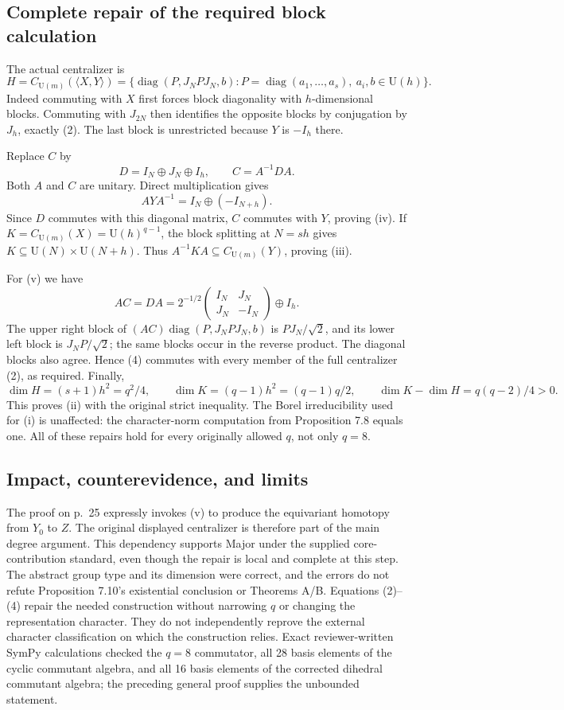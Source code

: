 \documentclass[10pt]{article}
\begin{document}
\subsection*{Complete repair of the required block calculation}
The actual centralizer is \[H=C_{\mathrm U(m)}(\langle X,Y\rangle)
 =\{\operatorname{diag}(P,J_NPJ_N,b):
       P=\operatorname{diag}(a_1,\ldots,a_s),\ a_i,b\in\mathrm U(h)\}.
 \tag{2}\] Indeed commuting with \(X\) first forces block diagonality with \(h\)-dimensional blocks. Commuting with \(J_{2N}\) then identifies the opposite blocks by conjugation by \(J_h\), exactly (2). The last block is unrestricted because \(Y\) is \(-I_h\) there.\par
Replace \(C\) by \[D=I_N\oplus J_N\oplus I_h,\qquad C=A^{-1}DA.
 \tag{3}\] Both \(A\) and \(C\) are unitary. Direct multiplication gives \[AYA^{-1}=I_N\oplus(-I_{N+h}).\] Since \(D\) commutes with this diagonal matrix, \(C\) commutes with \(Y\), proving (iv). If \(K=C_{\mathrm U(m)}(X)=\mathrm U(h)^{q-1}\), the block splitting at \(N=sh\) gives \(K\subseteq\mathrm U(N)\times\mathrm U(N+h)\). Thus \(A^{-1}KA\subseteq C_{\mathrm U(m)}(Y)\), proving (iii).\par
For (v) we have \[AC=DA=2^{-1/2}
 \begin{pmatrix}I_N&J_N\\ J_N&-I_N\end{pmatrix}\oplus I_h .
 \tag{4}\] The upper right block of \((AC)\operatorname{diag}(P,J_NPJ_N,b)\) is \(PJ_N/\sqrt2\), and its lower left block is \(J_NP/\sqrt2\); the same blocks occur in the reverse product. The diagonal blocks also agree. Hence (4) commutes with every member of the full centralizer (2), as required. Finally, \[\dim H=(s+1)h^2=q^2/4,\qquad
 \dim K=(q-1)h^2=(q-1)q/2,\qquad
 \dim K-\dim H=q(q-2)/4>0.\] This proves (ii) with the original strict inequality. The Borel irreducibility used for (i) is unaffected: the character-norm computation from Proposition 7.8 equals one. All of these repairs hold for every originally allowed \(q\), not only \(q=8\).\par
\subsection*{Impact, counterevidence, and limits}
The proof on p. 25 expressly invokes (v) to produce the equivariant homotopy from \(Y_0\) to \(Z\). The original displayed centralizer is therefore part of the main degree argument. This dependency supports Major under the supplied core-contribution standard, even though the repair is local and complete at this step. The abstract group type and its dimension were correct, and the errors do not refute Proposition 7.10’s existential conclusion or Theorems A/B. Equations (2)–(4) repair the needed construction without narrowing \(q\) or changing the representation character. They do not independently reprove the external character classification on which the construction relies. Exact reviewer-written SymPy calculations checked the \(q=8\) commutator, all 28 basis elements of the cyclic commutant algebra, and all 16 basis elements of the corrected dihedral commutant algebra; the preceding general proof supplies the unbounded statement.\par
\end{document}
